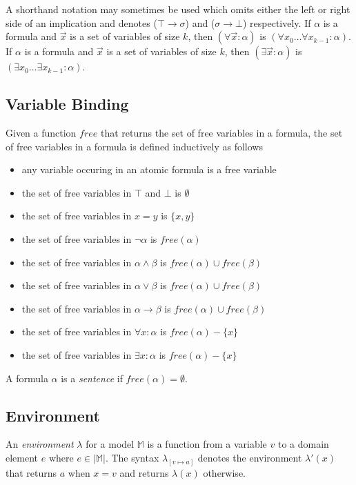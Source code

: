 		A shorthand notation may sometimes be used which omits either the left
		or right side of an implication and denotes ($\top \to \sigma$) and
		($\sigma \to \bot$) respectively.  If $\alpha$ is a formula and
		$\vec{x}$ is a set of variables of size $k$, then $(\forall \vec{x} :
		\alpha)$ is $(\forall x_0 \ldots \forall x_{k-1} : \alpha)$.  If
		$\alpha$ is a formula and $\vec{x}$ is a set of variables of size $k$,
		then $(\exists \vec{x} : \alpha)$ is $(\exists x_0 \ldots \exists
		x_{k-1} : \alpha)$.

	\subsection{Variable Binding}

		Given a function $free$ that returns the set of free variables in a
		formula, the set of free variables in a formula is defined inductively
		as follows
		\begin{itemize}
		\item any variable occuring in an atomic formula is a free variable
		\item the set of free variables in $\top$ and $\bot$ is $\emptyset$
		\item the set of free variables in $x = y$ is $\{x,y\}$
		\item the set of free variables in $\neg\alpha$ is $free(\alpha)$
		\item the set of free variables in $\alpha \wedge \beta$ is $free(\alpha) \cup free(\beta)$
		\item the set of free variables in $\alpha \vee   \beta$ is $free(\alpha) \cup free(\beta)$
		\item the set of free variables in $\alpha \to    \beta$ is $free(\alpha) \cup free(\beta)$
		\item the set of free variables in $\forall x : \alpha$ is $free(\alpha) - \{x\}$
		\item the set of free variables in $\exists x : \alpha$ is $free(\alpha) - \{x\}$
		\end{itemize}
		A formula $\alpha$ is a \emph{sentence} if $free(\alpha) = \emptyset$.

	\subsection{Environment}

		An \emph{environment} $\lambda$ for a model $\mathbb{M}$ is a function
		from a variable $v$ to a domain element $e$ where $e \in |\mathbb{M}|$.
		The syntax $\lambda_{[v \mapsto a]}$ denotes the environment
		$\lambda'(x)$ that returns $a$ when $x=v$ and returns $\lambda(x)$
		otherwise.

